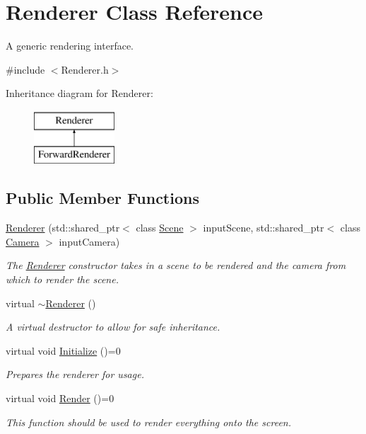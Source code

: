 \hypertarget{class_renderer}{}\section{Renderer Class Reference}
\label{class_renderer}


A generic rendering interface.  




{\ttfamily \#include $<$Renderer.\+h$>$}

Inheritance diagram for Renderer\+:\begin{figure}[H]
\begin{center}
\leavevmode
\includegraphics[height=2.000000cm]{class_renderer}
\end{center}
\end{figure}
\subsection*{Public Member Functions}
\begin{DoxyCompactItemize}
\item 
\hyperlink{class_renderer_adc8ce31cd649bdf220ca8355809b1d06}{Renderer} (std\+::shared\+\_\+ptr$<$ class \hyperlink{class_scene}{Scene} $>$ input\+Scene, std\+::shared\+\_\+ptr$<$ class \hyperlink{class_camera}{Camera} $>$ input\+Camera)
\begin{DoxyCompactList}\small\item\em The \hyperlink{class_renderer}{Renderer} constructor takes in a scene to be rendered and the camera from which to render the scene. \end{DoxyCompactList}\item 
virtual \hyperlink{class_renderer_afeee408862d5bd6255a6882d47e6d5cd}{$\sim$\+Renderer} ()
\begin{DoxyCompactList}\small\item\em A virtual destructor to allow for safe inheritance. \end{DoxyCompactList}\item 
virtual void \hyperlink{class_renderer_a7cb221f355f181d84d66e8c09f50f04a}{Initialize} ()=0
\begin{DoxyCompactList}\small\item\em Prepares the renderer for usage. \end{DoxyCompactList}\item 
virtual void \hyperlink{class_renderer_a38623da22aa718cfa41e2514ebd269f5}{Render} ()=0
\begin{DoxyCompactList}\small\item\em This function should be used to render everything onto the screen. \end{DoxyCompactList}\end{DoxyCompactItemize}
